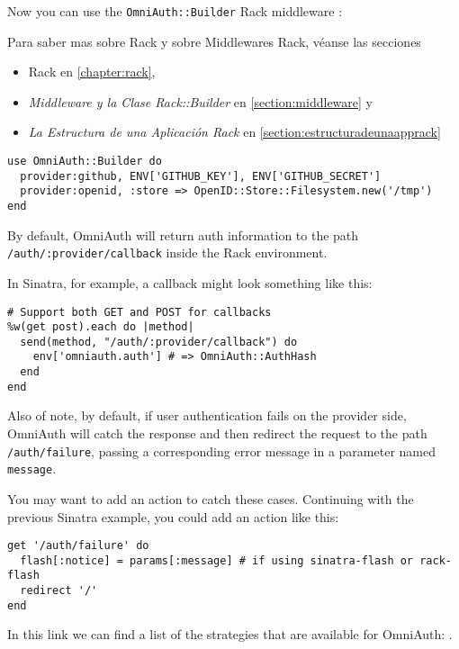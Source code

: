 Now you can use the \verb|OmniAuth::Builder| 
Rack middleware :

Para saber mas sobre Rack y sobre Middlewares Rack,
véanse las secciones 
\begin{itemize}
\item
Rack en \ref{chapter:rack},
\item
{\it Middleware y la Clase Rack::Builder} en \ref{section:middleware} 
y
\item
{\it La Estructura de una Aplicación Rack}
en
\ref{section:estructuradeunaapprack}
\end{itemize}

\begin{verbatim}
use OmniAuth::Builder do
  provider:github, ENV['GITHUB_KEY'], ENV['GITHUB_SECRET']
  provider:openid, :store => OpenID::Store::Filesystem.new('/tmp')
end
\end{verbatim}
By default, OmniAuth will return auth information to the path
\verb|/auth/:provider/callback| inside the Rack environment. 

In Sinatra, for
example, a callback might look something like this:

\begin{verbatim}
# Support both GET and POST for callbacks
%w(get post).each do |method|
  send(method, "/auth/:provider/callback") do
    env['omniauth.auth'] # => OmniAuth::AuthHash
  end
end
\end{verbatim}

Also of note, by default, if user authentication fails on the provider
side, OmniAuth will catch the response and then redirect the request
to the path \verb|/auth/failure|,
 passing a corresponding error message in a
parameter named \verb|message|. 

You may want to add an action to catch these
cases. Continuing with the previous Sinatra example, you could add an
action like this:

\begin{verbatim}
get '/auth/failure' do
  flash[:notice] = params[:message] # if using sinatra-flash or rack-flash
  redirect '/'
end
\end{verbatim}


In this link we can find a list of the strategies that are available for OmniAuth:
.


